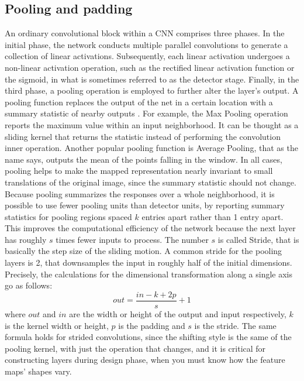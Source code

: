 \documentclass[binding=0.7cm, oneside]{sapthesis}
\begin{document}
\subsection{Pooling and padding}
An ordinary convolutional block within a CNN comprises three phases. In the initial phase, the network conducts multiple parallel convolutions to generate a collection of linear activations.
Subsequently, each linear activation undergoes a non-linear activation operation, such as the rectified linear activation function or the sigmoid, in what is sometimes referred to as the detector stage.
Finally, in the third phase, a pooling operation is employed to further alter the layer's output.
A pooling function replaces the output of the net in a certain location with a summary statistic of nearby outputs \cite{pooling}. For example, the Max Pooling operation reports the maximum value within an input neighborhood.
It can be thought as a sliding kernel that returns the statistic instead of performing the convolution inner operation. Another popular pooling function is Average Pooling, that as the name says,
outputs the mean of the points falling in the window. In all cases, pooling helps to make the mapped representation nearly invariant to small translations of the original image, since the summary statistic should not change.
Because pooling summarizes the responses over a whole neighborhood, it is possible to use fewer pooling units than detector units, by reporting summary statistics for pooling regions spaced $k$ entries apart rather than 1 entry apart.
This improves the computational efficiency of the network because the next layer has roughly $s$ times fewer inputs to process. The number $s$ is called Stride, that is basically the step size of the sliding motion.
A common stride for the pooling layers is 2, that downsamples the input in roughly half of the initial dimensions. Precisely, the calculations for the dimensional transformation along a single axis go as follows:
$$out = \frac{in - k + 2p}{s} + 1$$
where $out$ and $in$ are the width or height of the output and input respectively, $k$ is the kernel width or height, $p$ is the padding and $s$ is the stride. The same formula holds for strided convolutions, since the shifting style is the same
of the pooling kernel, with just the operation that changes, and it is critical for constructing layers during design phase, when you must know how the feature maps' shapes vary.
\end{document}
